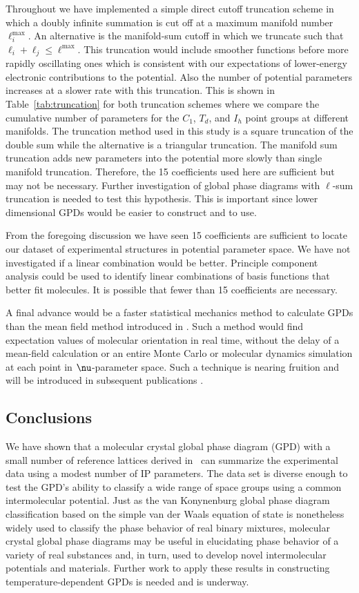 \documentclass[preprint]{iucr}              %
\newcommand{\mb}[1]{\ensuremath{\mbox{\boldmath $ #1 $}}}
\begin{document}
Throughout we have implemented a simple direct cutoff truncation
scheme in which a doubly infinite summation is cut off at a maximum
manifold number $\ell_i^\mathrm{max}$.  An alternative is the
manifold-sum cutoff in which we truncate such that $\ell_i+\ell_j\le
\ell^\mathrm{max}$. This truncation would include smoother functions
before more rapidly oscillating ones which is consistent with our
expectations of lower-energy electronic contributions to the
potential. Also the number of potential parameters increases at a
slower rate with this truncation. This is shown in
Table~\ref{tab:truncation} for both truncation schemes where we
compare the cumulative number of parameters for the $C_1$, $T_d$,
and $I_h$ point groups at different manifolds. The truncation method
used in this study is a square truncation of the double sum while
the alternative is a triangular truncation. The manifold sum
truncation adds new parameters into the potential more slowly than
single manifold truncation. Therefore, the 15 coefficients used here
are sufficient but may not be necessary. Further investigation of
global phase diagrams with $\ell$-sum truncation is needed to test
this hypothesis. This is important since lower dimensional GPDs
would be easier to construct and to use.

From the foregoing discussion we have seen 15 coefficients are
sufficient to locate our dataset of experimental
structures in potential parameter space.  We have not investigated if a linear
combination would
be better.  Principle component analysis could be used to identify
linear combinations of basis functions that better fit molecules. It
is possible that fewer than 15 coefficients are necessary.  

A final advance would be a faster statistical mechanics method to calculate GPDs
than the mean field method introduced in \cite{Mettes04}.  Such a method would
find expectation values of molecular orientation in real time, without the delay
of a mean-field calculation or an entire Monte Carlo or molecular dynamics
simulation at each point in $\mb{\nu}$-parameter space.  Such a technique is
nearing fruition and will be introduced in subsequent publications
\cite{Keith09b}.


\subsection{Conclusions}

We have shown that a molecular crystal global phase diagram (GPD)
with a small number of reference lattices derived
in~\cite{McClurg09} can summarize the experimental data using a
modest number of IP parameters. The data set is diverse enough to
test the GPD's ability to classify a wide range of space groups
using a common intermolecular potential. Just as the van Konynenburg
global phase diagram classification based on the simple van der
Waals equation of state is nonetheless widely used to classify the
phase behavior of real binary mixtures, molecular crystal global
phase diagrams may be useful in elucidating phase behavior of a
variety of real substances and, in turn, used to develop novel
intermolecular potentials and materials. Further work to apply these results in
constructing temperature-dependent GPDs is needed and is underway.
\end{document}
